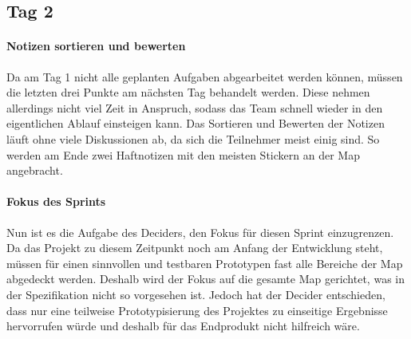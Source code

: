 \subsection*{\label{sec:Sprint-Umsetzung-Tag2}\thesubsection\quad Tag 2}
\paragraph{Notizen sortieren und bewerten}
Da am Tag 1 nicht alle geplanten Aufgaben abgearbeitet werden können, müssen die letzten drei Punkte am nächsten Tag behandelt werden. Diese nehmen allerdings nicht viel Zeit in Anspruch, sodass das Team schnell wieder in den eigentlichen Ablauf einsteigen kann. Das Sortieren und Bewerten der Notizen läuft ohne viele Diskussionen ab, da sich die Teilnehmer meist einig sind. So werden am Ende zwei Haftnotizen mit den meisten Stickern an der Map angebracht.


\paragraph{Fokus des Sprints}
Nun ist es die Aufgabe des Deciders, den Fokus für diesen Sprint einzugrenzen. Da das Projekt zu diesem Zeitpunkt noch am Anfang der Entwicklung steht, müssen für einen sinnvollen und testbaren Prototypen fast alle Bereiche der Map abgedeckt werden. Deshalb wird der Fokus auf die gesamte Map gerichtet, was in der Spezifikation nicht so vorgesehen ist. Jedoch hat der Decider entschieden, dass nur eine teilweise Prototypisierung des Projektes zu einseitige Ergebnisse hervorrufen würde und deshalb für das Endprodukt nicht hilfreich wäre.

